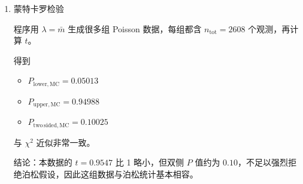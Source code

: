 \begin{question}
\begin{solution}
\begin{enumerate}
\item 蒙特卡罗检验

程序用 \(\lambda=\bar m\) 生成很多组 Poisson 数据，每组都含
\(n_{\mathrm{tot}}=2608\) 个观测，再计算 \(t\)。

得到

\begin{itemize}
\item
  \(P_{\mathrm{lower,MC}}=0.05013\)
\item
  \(P_{\mathrm{upper,MC}}=0.94988\)
\item
  \(P_{\mathrm{two\,sided,MC}}=0.10025\)
\end{itemize}

与 \(\chi^2\) 近似非常一致。

结论：本数据的 \(t=0.9547\) 比 1 略小，但双侧 \(P\) 值约为
\(0.10\)，不足以强烈拒绝泊松假设，因此这组数据与泊松统计基本相容。
\end{enumerate}
\end{solution}
\end{question}

